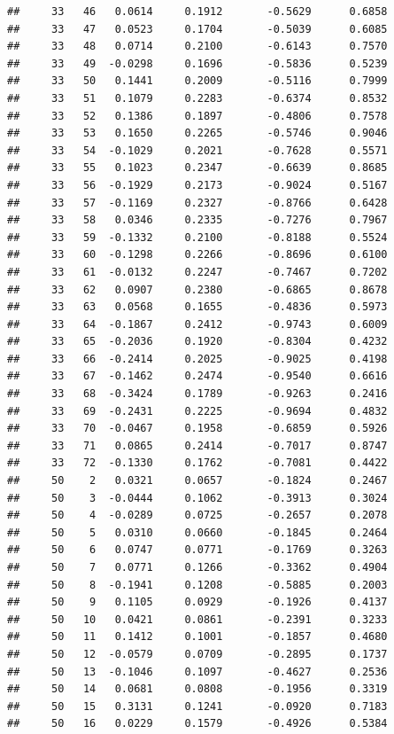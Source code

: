 \documentclass[
]{article}
\begin{document}
\begin{verbatim}
##     33   46   0.0614     0.1912       -0.5629      0.6858  
##     33   47   0.0523     0.1704       -0.5039      0.6085  
##     33   48   0.0714     0.2100       -0.6143      0.7570  
##     33   49  -0.0298     0.1696       -0.5836      0.5239  
##     33   50   0.1441     0.2009       -0.5116      0.7999  
##     33   51   0.1079     0.2283       -0.6374      0.8532  
##     33   52   0.1386     0.1897       -0.4806      0.7578  
##     33   53   0.1650     0.2265       -0.5746      0.9046  
##     33   54  -0.1029     0.2021       -0.7628      0.5571  
##     33   55   0.1023     0.2347       -0.6639      0.8685  
##     33   56  -0.1929     0.2173       -0.9024      0.5167  
##     33   57  -0.1169     0.2327       -0.8766      0.6428  
##     33   58   0.0346     0.2335       -0.7276      0.7967  
##     33   59  -0.1332     0.2100       -0.8188      0.5524  
##     33   60  -0.1298     0.2266       -0.8696      0.6100  
##     33   61  -0.0132     0.2247       -0.7467      0.7202  
##     33   62   0.0907     0.2380       -0.6865      0.8678  
##     33   63   0.0568     0.1655       -0.4836      0.5973  
##     33   64  -0.1867     0.2412       -0.9743      0.6009  
##     33   65  -0.2036     0.1920       -0.8304      0.4232  
##     33   66  -0.2414     0.2025       -0.9025      0.4198  
##     33   67  -0.1462     0.2474       -0.9540      0.6616  
##     33   68  -0.3424     0.1789       -0.9263      0.2416  
##     33   69  -0.2431     0.2225       -0.9694      0.4832  
##     33   70  -0.0467     0.1958       -0.6859      0.5926  
##     33   71   0.0865     0.2414       -0.7017      0.8747  
##     33   72  -0.1330     0.1762       -0.7081      0.4422  
##     50    2   0.0321     0.0657       -0.1824      0.2467  
##     50    3  -0.0444     0.1062       -0.3913      0.3024  
##     50    4  -0.0289     0.0725       -0.2657      0.2078  
##     50    5   0.0310     0.0660       -0.1845      0.2464  
##     50    6   0.0747     0.0771       -0.1769      0.3263  
##     50    7   0.0771     0.1266       -0.3362      0.4904  
##     50    8  -0.1941     0.1208       -0.5885      0.2003  
##     50    9   0.1105     0.0929       -0.1926      0.4137  
##     50   10   0.0421     0.0861       -0.2391      0.3233  
##     50   11   0.1412     0.1001       -0.1857      0.4680  
##     50   12  -0.0579     0.0709       -0.2895      0.1737  
##     50   13  -0.1046     0.1097       -0.4627      0.2536  
##     50   14   0.0681     0.0808       -0.1956      0.3319  
##     50   15   0.3131     0.1241       -0.0920      0.7183  
##     50   16   0.0229     0.1579       -0.4926      0.5384  

\end{verbatim}
\end{document}
